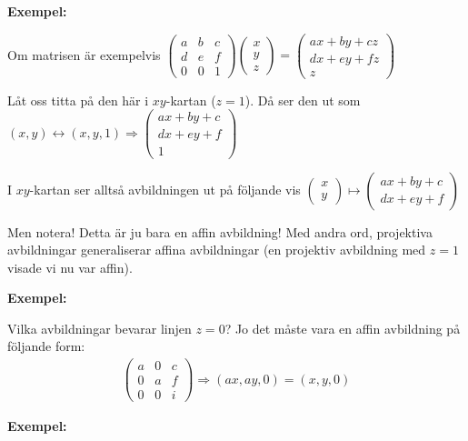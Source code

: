 \par\bigskip
\noindent\textbf{Exempel:}\par
\noindent Om matrisen är exempelvis $\begin{pmatrix}a&b&c\\d&e&f\\0&0&1\end{pmatrix}\begin{pmatrix}x\\y\\z\end{pmatrix} = \begin{pmatrix}ax+by+cz\\dx+ey+fz\\z\end{pmatrix}$
\par\noindent Låt oss titta på den här i $xy$-kartan ($z=1$). Då ser den ut som $(x,y)\leftrightarrow(x,y,1) \Rightarrow \begin{pmatrix}ax+by+c\\dx+ey+f\\1\end{pmatrix}$\par
\noindent I $xy$-kartan ser alltså avbildningen ut på följande vis $\begin{pmatrix}x\\y\end{pmatrix}\mapsto\begin{pmatrix}ax+by+c\\dx+ey+f\end{pmatrix}$
\par\bigskip
\noindent Men notera! Detta är ju bara en affin avbildning! Med andra ord, projektiva avbildningar generaliserar affina avbildningar (en projektiv avbildning med $z=1$ visade vi nu var affin).
\par\bigskip
\noindent\textbf{Exempel:}\par
\noindent Vilka avbildningar bevarar linjen $z=0$? Jo det måste vara en affin avbildning på följande form:
\begin{equation*}
  \begin{gathered}
    \begin{pmatrix}a&0&c\\0&a&f\\0&0&i\end{pmatrix}\Rightarrow (ax,ay,0) = (x,y,0)
  \end{gathered}
\end{equation*}
\par\bigskip\bigskip
\noindent\textbf{Exempel:}\par
